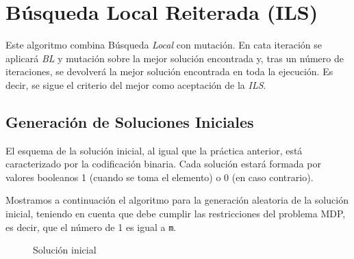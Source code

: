 \newpage
\section{Búsqueda Local Reiterada (ILS)}

\hspace{1.5cm}Este algoritmo combina Búsqueda \textit{Local} con mutación. En cata iteración se aplicará \textit{BL} y mutación sobre la mejor solución encontrada y, tras un número de iteraciones, se devolverá la mejor solución encontrada en toda la ejecución. Es decir, se sigue el criterio del mejor como aceptación de la \textit{ILS}.

\subsection{Generación de Soluciones Iniciales}
El esquema de la solución inicial, al igual que la práctica anterior, está caracterizado por la codificación binaria. Cada solución estará formada por valores booleanos 1 (cuando se toma el elemento) o 0 (en caso contrario). 

Mostramos a continuación el algoritmo para la generación aleatoria de la solución inicial, teniendo en cuenta que debe cumplir las restricciones del problema MDP, es decir, que el número de 1 es igual a \texttt{m}.

\begin{figure}[H]
	\centering
	\begin{minipage}{.8\linewidth}
		
		
		
		\begin{algorithm}[H] 
			
			\caption{Solución inicial}
			\SetAlgoLined
			
			
			
		\end{algorithm} 
		
	\end{minipage}
\end{figure}










